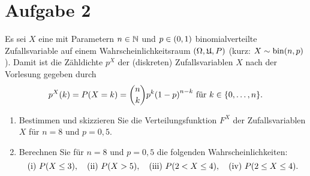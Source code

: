\documentclass{exercise}
\begin{document}
    \section*{Aufgabe 2}

    \begin{problem}
        Es sei \(X\) eine mit Parametern \(n \in \N\) und \(p \in \parentheses*{0, 1}\) binomialverteilte Zufallsvariable auf einem Wahrscheinlichkeitsraum \(\parentheses*{\Omega, \mathfrak{U}, P}\) (kurz: \(X \sim \bin\parentheses*{n, p}\)).
        Damit ist die Zähldichte \(p^X\) der (diskreten) Zufallsvariablen \(X\) nach der Vorlesung gegeben durch
        \[
            p^X\parentheses*{k} = P\parentheses*{X = k} = \binom{n}{k}p^k\parentheses*{1 - p}^{n - k}\text{ für } k \in \braces*{0, \ldots, n}.
        \]
        \begin{enumerate}
            \item Bestimmen und skizzieren Sie die Verteilungsfunktion \(F^X\) der Zufallsvariablen \(X\) für \(n = 8\) und \(p = 0,5\).
            \item Berechnen Sie für \(n = 8\) und \(p = 0,5\) die folgenden Wahrscheinlichkeiten:
            \[
                \text{(i) }P\parentheses*{X \le 3}, \quad \text{(ii) }P\parentheses*{X > 5}, \quad \text{(iii) }P\parentheses*{2 < X \le 4}, \quad \text{(iv) }P\parentheses*{2 \le X \le 4}. 
            \]
        \end{enumerate}
    \end{problem}
\end{document}
